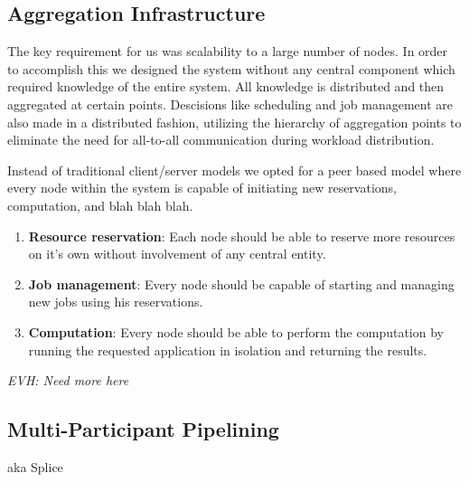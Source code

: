 \subsection{Aggregation Infrastructure}

The key requirement for us was scalability to a large number of nodes.  
In order to accomplish this we designed the system without any central
component which required knowledge of the entire system.
All knowledge is distributed and then aggregated at certain points.
Descisions like scheduling and job management are also made in a
distributed fashion, utilizing the hierarchy of aggregation points
to eliminate the need for all-to-all communication during workload
distribution.

Instead of traditional client/server models we opted for a peer based
model where every node within the system is capable of initiating new
reservations, computation, and blah blah blah.
\begin{enumerate}
\item \textbf{Resource reservation}: Each node should be able to reserve more
resources on it's own without involvement of any central entity.

\item \textbf{Job management}: Every node should be capable of starting and
managing new jobs using his reservations.

\item \textbf{Computation}: Every node should be able to perform the
computation by running the requested application in isolation and returning
the results.
\end{enumerate}

\emph{EVH: Need more here}

\subsection{Multi-Participant Pipelining}

aka Splice
